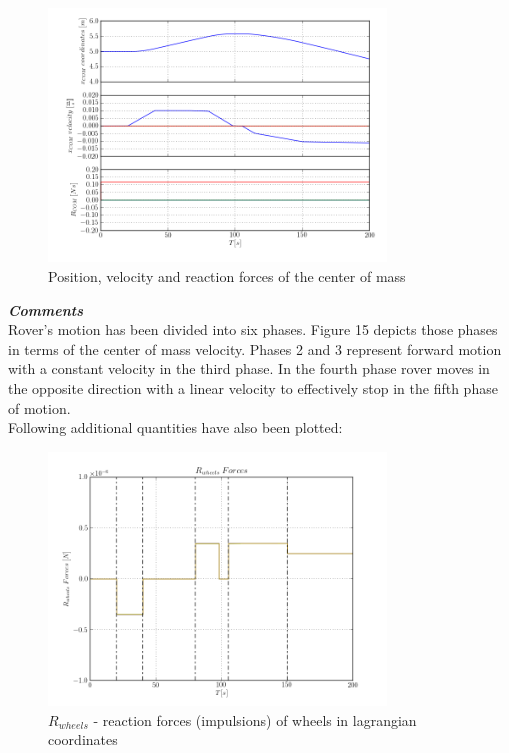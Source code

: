 \begin{figure}[H]
  \centering
    \includegraphics[width=0.8\textwidth]{xvpCOM3}
  \caption{Position, velocity and reaction forces of the center of mass}
\end{figure}

\noindent \textbf{\textit{\Large{Comments}}}\\[1mm]
\noindent Rover's motion has been divided into six phases. Figure 15 depicts those phases in terms of the center of mass velocity. Phases 2 and 3 represent forward motion with 
a constant velocity in the third phase. In the fourth phase rover moves in the opposite direction with a linear velocity to effectively stop in the fifth phase of motion.\\

\noindent Following additional quantities have also been plotted:

\begin{figure}[H]
  \centering
    \includegraphics[width=0.8\textwidth]{pWHEELS3}
  \caption{$R_{wheels}$ - reaction forces (impulsions) of wheels in lagrangian coordinates}
\end{figure}


